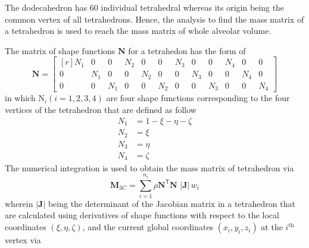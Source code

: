 The dodecahedron has 60 individual tetrahedral whereas its origin being the common vertex of all tetrahedrons. Hence, the analysis to find the mass matrix of a tetrahedron is used to reach the mass matrix of whole alveolar volume.

The matrix of shape functions $\mathbf{N}$ for a tetrahedon has the form of
\begin{equation}
	\mathbf{N} =  
\begin{bmatrix*}[r]
	N_1 & 0 & 0 & N_2 & 0 & 0 & N_3 & 0 & 0 & N_4 & 0 & 0 \\
	0 & N_1 & 0 & 0 & N_2 & 0 & 0 & N_3 & 0 & 0 & N_4 & 0 \\
	0 & 0 & N_1 & 0 & 0 & N_2 & 0 & 0 & N_3 & 0 & 0 & N_4
\end{bmatrix*} 
	\label{shape3D}
\end{equation}
in which $\mathrm{N}_i (i = 1, 2, 3, 4)$ are four shape functions corresponding to the four vertices of the tetrahedron that are defined as follow
\begin{subequations}
\begin{align}
	N_1 & = 1 - \xi - \eta - \zeta \\
	N_2 & = \xi \\
	N_3 & = \eta \\
	N_4 & = \zeta
\end{align}
\end{subequations}
The numerical integration is used to obtain the mass matrix of tetrahedron via
\begin{equation}
    \mathbf{M}_{3C} = \sum_{i=1}^{n_i} \rho  \mathbf{N}^{\mathsf{T}} \mathbf{N} \,  \,|\mathbf{J}| \, w_i
\end{equation}
wherein $|\mathbf{J}|$ being the determinant of the Jacobian matrix in a tetrahedron that are calculated using derivatives of shape functions with respect to the local coordinates $(\xi, \eta, \zeta)$, and the current global coordinates $(x_i, y_i, z_i)$ at the $i^{\mathrm{th}}$ vertex via

